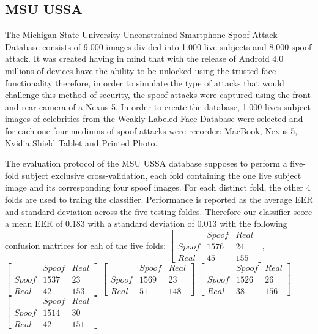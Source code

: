 \subsection{MSU USSA}
The Michigan State University Unconstrained Smartphone Spoof Attack Database consists of 9.000 images divided into 1.000 live subjects and 8.000 spoof attack. It was created having in mind that with the release of Android 4.0 millions of devices have the ability to be unlocked using the trusted face functionality therefore, in order to simulate the type of attacks that would challenge this method of security, the spoof attacks were captured using the front and rear camera of a Nexus 5. In order to create the database, 1.000 lives subject images of celebrities from the Weakly Labeled Face Database were selected and for each one four mediums of spoof attacks were recorder: MacBook, Nexus 5, Nvidia Shield Tablet and Printed Photo. 

The evaluation protocol of the MSU USSA database supposes to perform a five-fold subject exclusive cross-validation, each fold containing the one live subject image and its corresponding four spoof images. For each distinct fold, the other 4 folds are used to traing the classifier. Performance is reported as the average EER and standard deviation across the five testing foldes. Therefore our classifier score a mean EER of $0.183$ with a standard deviation of $0.013$ with the following confusion matrices for eah of the five folds:
$
[
\begin{smallmatrix}
&Spoof & Real\\
Spoof & 1576 & 24\\
Real & 45 & 155
\end{smallmatrix}]
$, 
$
[
\begin{smallmatrix}
&Spoof & Real\\
Spoof & 1537 & 23\\
Real & 42 & 153
\end{smallmatrix}]
$
$
[
\begin{smallmatrix}
&Spoof & Real\\
Spoof & 1569 & 23\\
Real & 51 & 148
\end{smallmatrix}] 
$
$
[
\begin{smallmatrix}
&Spoof & Real\\
Spoof & 1526 & 26\\
Real & 38 & 156
\end{smallmatrix}] 
$
$
[
\begin{smallmatrix}
&Spoof & Real\\
Spoof & 1514 & 30\\
Real & 42 & 151
\end{smallmatrix}] 
$



